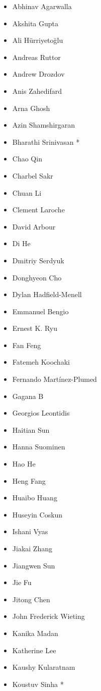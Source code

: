 \begingroup
\fontsize{8pt}{8pt}\selectfont
\begin{multicols}{3}
\begin{itemize}[label={}]
\item Abhinav Agarwalla
\item Akshita Gupta
\item Ali Hürriyetoğlu
\item Andreas Ruttor
\item Andrew Drozdov
\item Anis Zahedifard
\item Arna Ghosh
\item Azin Shamshirgaran
\item Bharathi Srinivasan *
\item Chao Qin
\item Charbel Sakr
\item Chuan Li
\item Clement Laroche
\item David Arbour
\item Di He
\item Dmitriy Serdyuk
\item Donghyeon Cho
\item Dylan Hadfield-Menell
\item Emmanuel Bengio
\item Ernest K. Ryu
\item Fan Feng
\item Fatemeh Koochaki
\item Fernando Martínez-Plumed
\item Gagana B
\item Georgios Leontidis
\item Haitian Sun
\item Hanna Suominen
\item Hao He
\item Heng Fang
\item Huaibo Huang
\item Huseyin Coskun
\item Ishani Vyas
\item Jiakai Zhang
\item Jiangwen Sun
\item Jie Fu
\item Jitong Chen
\item John Frederick Wieting
\item Kanika Madan
\item Katherine Lee
\item Kaushy Kularatnam
\item Koustuv Sinha *

\end{itemize}
\end{multicols}
